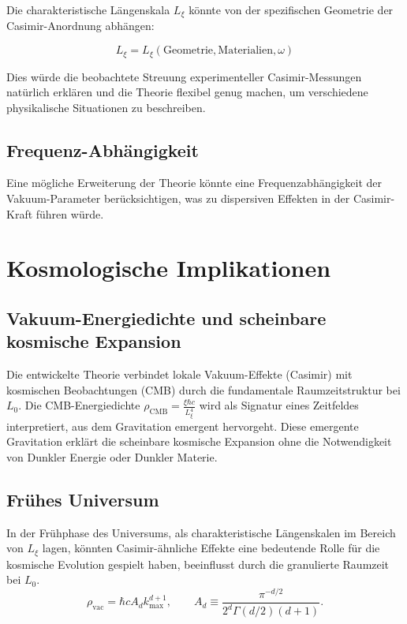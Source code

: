 	Die charakteristische Längenskala \( L_\xi \) könnte von der spezifischen Geometrie der Casimir-Anordnung abhängen:
	
	\begin{equation}
		L_\xi = L_\xi(\text{Geometrie}, \text{Materialien}, \omega) \label{eq:Lxi_dependencies}
	\end{equation}
	
	Dies würde die beobachtete Streuung experimenteller Casimir-Messungen natürlich erklären und die Theorie flexibel genug machen, um verschiedene physikalische Situationen zu beschreiben.
	
	\subsection{Frequenz-Abhängigkeit}
	
	Eine mögliche Erweiterung der Theorie könnte eine Frequenzabhängigkeit der Vakuum-Parameter berücksichtigen, was zu dispersiven Effekten in der Casimir-Kraft führen würde.
	
	\section{Kosmologische Implikationen}
	
	\subsection{Vakuum-Energiedichte und scheinbare kosmische Expansion}
	
	Die entwickelte Theorie verbindet lokale Vakuum-Effekte (Casimir) mit kosmischen Beobachtungen (CMB) durch die fundamentale Raumzeitstruktur bei \( L_0 \). Die CMB-Energiedichte \( \rho_{\text{CMB}} = \frac{\xi \hbar c}{L_\xi^4} \) wird als Signatur eines Zeitfeldes interpretiert, aus dem Gravitation emergent hervorgeht. Diese emergente Gravitation erklärt die scheinbare kosmische Expansion ohne die Notwendigkeit von Dunkler Energie oder Dunkler Materie.
	
	\subsection{Frühes Universum}
	
	In der Frühphase des Universums, als charakteristische Längenskalen im Bereich von \( L_\xi \) lagen, könnten Casimir-ähnliche Effekte eine bedeutende Rolle für die kosmische Evolution gespielt haben, beeinflusst durch die granulierte Raumzeit bei \( L_0 \).
	\begin{equation}	
		\rho_{\mathrm{vac}} = \hbar c  A_d  k_{\max}^{d+1},
		\qquad
		A_d \equiv \frac{\pi^{-d/2}}{2^d\Gamma(d/2)(d+1)}.
	\end{equation}
	
